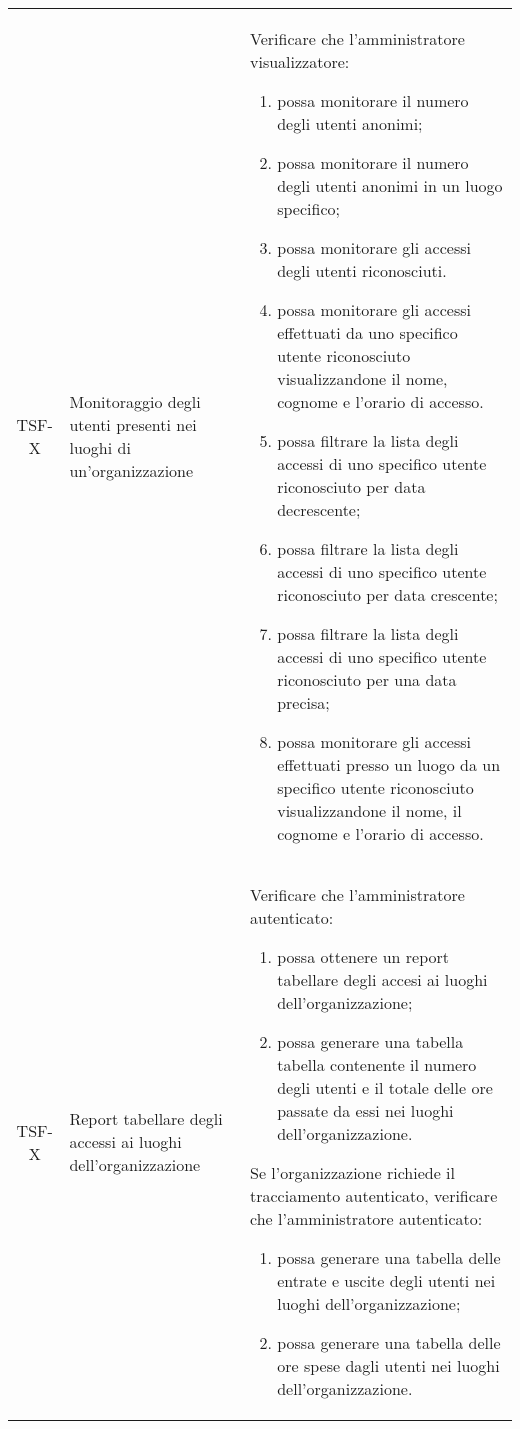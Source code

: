 {\begin{longtable}{ c | C{3cm} | C{11cm} }
TSF-X & Monitoraggio degli utenti presenti nei luoghi di un'organizzazione &
Verificare che l'amministratore visualizzatore:
\begin{enumerate}
    \item possa monitorare il numero degli utenti anonimi;
    \item possa monitorare il numero degli utenti anonimi in un luogo specifico;
    \item possa monitorare gli accessi degli utenti riconosciuti.
    \item possa monitorare gli accessi effettuati da uno specifico utente riconosciuto visualizzandone il nome, cognome e l'orario di accesso.
    \item possa filtrare la lista degli accessi di uno specifico utente riconosciuto per data decrescente;
    \item possa filtrare la lista degli accessi di uno specifico utente riconosciuto per data crescente;
    \item possa filtrare la lista degli accessi di uno specifico utente riconosciuto per una data precisa;
    \item possa monitorare gli accessi effettuati presso un luogo da un specifico utente riconosciuto visualizzandone il nome, il cognome e l’orario di accesso.
\end{enumerate} \\

TSF-X & Report tabellare degli accessi ai luoghi dell'organizzazione &
Verificare che l'amministratore autenticato:
\begin{enumerate}
    \item possa ottenere un report tabellare degli accesi ai luoghi dell'organizzazione;
    \item possa generare una tabella tabella contenente il numero degli utenti e il totale delle ore passate da essi nei luoghi dell’organizzazione.
\end{enumerate}
Se l'organizzazione richiede il tracciamento autenticato, verificare che l'amministratore autenticato:
\begin{enumerate}
    \item possa generare una tabella delle entrate e uscite degli utenti nei luoghi dell'organizzazione;
    \item possa generare una tabella delle ore spese dagli utenti nei luoghi dell'organizzazione.
\end{enumerate} \\


\end{longtable}}
